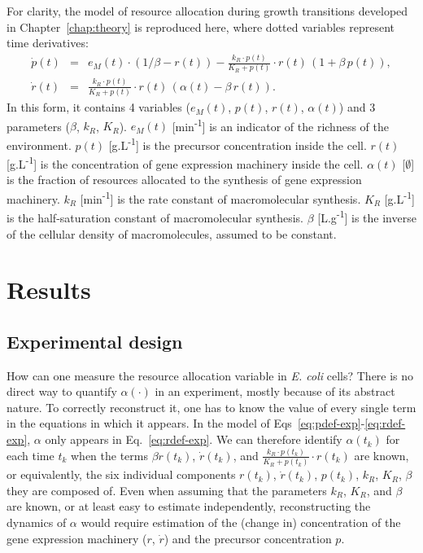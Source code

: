 For clarity, the model of resource allocation during growth transitions developed in Chapter~\ref{chap:theory} is reproduced here, where dotted variables represent time derivatives:
\begin{eqnarray}
\dot{p}(t) &=& e_M(t)\cdot (1/\beta - r(t)) - \frac{k_R \cdot p(t)}{K_R + p(t)}\cdot r(t) \, (1+\beta\, p(t)), \label{eq:pdef-exp}\\
\dot{r}(t) &=& \frac{k_R \cdot p(t)}{K_R + p(t)}\cdot r(t) \, (\alpha(t) - \beta\, r(t)). \label{eq:rdef-exp}
\end{eqnarray}
In this form, it contains 4 variables ($e_M(t)$, $p(t)$, $r(t)$, $\alpha (t)$) and 3 parameters ($\beta$, $k_R$, $K_R$).
$e_M(t)$ [min\textsuperscript{-1}] is an indicator of the richness of the environment.
$p(t)$ [g.L\textsuperscript{-1}] is the precursor concentration inside the cell.
$r(t)$ [g.L\textsuperscript{-1}] is the concentration of gene expression machinery inside the cell.
$\alpha (t)$ [$\emptyset$] is the fraction of resources allocated to the synthesis of gene expression machinery.
$k_R$ [min\textsuperscript{-1}] is the rate constant of macromolecular synthesis.
$K_R$ [g.L\textsuperscript{-1}] is the half-saturation constant of macromolecular synthesis.
$\beta$ [L.g\textsuperscript{-1}] is the inverse of the cellular density of macromolecules, assumed to be constant.



\section{Results}

\subsection{Experimental design}
\label{sec:exp_design}

How can one measure the resource allocation variable in \textit{E. coli} cells?
There is no direct way to quantify $\alpha (\cdot)$ in an experiment, mostly because of its abstract nature.
To correctly reconstruct it, one has to know the value of every single term in the equations in which it appears.
In the model of Eqs~\ref{eq:pdef-exp}-\ref{eq:rdef-exp}, $\alpha$ only appears in Eq.~\ref{eq:rdef-exp}.
We can therefore identify $\alpha (t_k)$ for each time $t_k$ when the terms $\beta r(t_k)$, $\dot{r}(t_k)$, and $\frac{k_R \cdot p(t_k)}{K_R + p(t_k)} \cdot r(t_k)$ are known, or equivalently, the six individual components $r(t_k)$, $\dot{r}(t_k)$, $p(t_k)$, $k_R$, $K_R$, $\beta$ they are composed of.
Even when assuming that the parameters $k_R$, $K_R$, and $\beta$ are known, or at least easy to estimate independently, reconstructing the dynamics of $\alpha$ would require estimation of the (change in) concentration of the gene expression machinery ($r$, $\dot{r}$) and the precursor concentration $p$.

